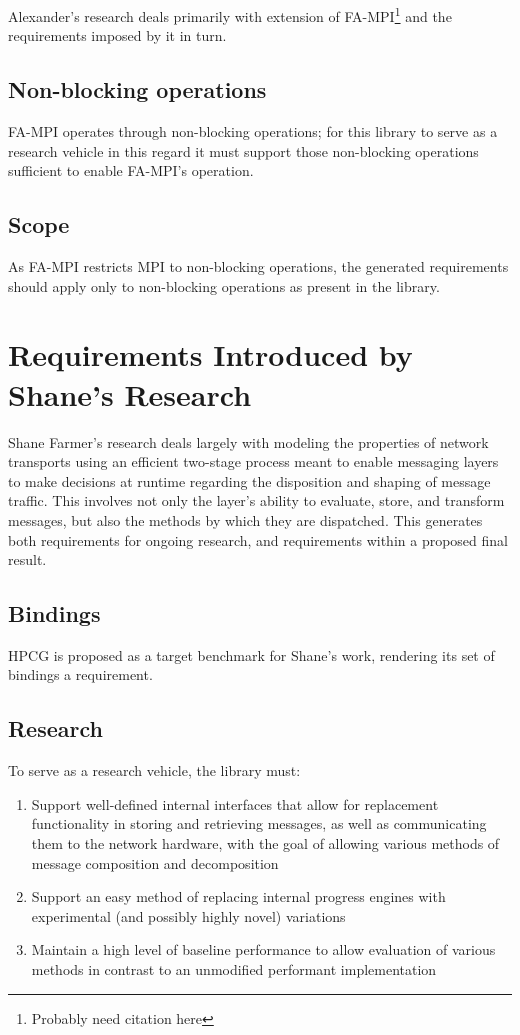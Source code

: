 \documentclass{article}
\begin{document}
Alexander's research deals primarily with extension of FA-MPI\footnote{Probably need citation here} and the requirements imposed by it in turn.  

\subsection{Non-blocking operations}

FA-MPI operates through non-blocking operations; for this library to serve as a research vehicle in this regard it must support those non-blocking operations sufficient to enable FA-MPI's operation.

\subsection{Scope}  

As FA-MPI restricts MPI to non-blocking operations, the generated requirements should apply only to non-blocking operations as present in the library.



\section{Requirements Introduced by Shane's Research}

Shane Farmer's research deals largely with modeling the properties of network transports using an efficient two-stage process meant to enable messaging layers to make decisions at runtime regarding the disposition and shaping of message traffic.  This involves not only the layer's ability to evaluate, store, and transform messages, but also the methods by which they are dispatched.  This generates both requirements for ongoing research, and requirements within a proposed final result.

\subsection{Bindings}  

HPCG is proposed as a target benchmark for Shane's work, rendering its set of bindings a requirement.

\subsection{Research} 

To serve as a research vehicle, the library must:

\begin{enumerate}
\item Support well-defined internal interfaces that allow for replacement functionality in storing and retrieving messages, as well as communicating them to the network hardware, with the goal of allowing various methods of message composition and decomposition
\item Support an easy method of replacing internal progress engines with experimental (and possibly highly novel) variations
\item Maintain a high level of baseline performance to allow evaluation of various methods in contrast to an unmodified performant implementation
\end{enumerate}
\end{document}
